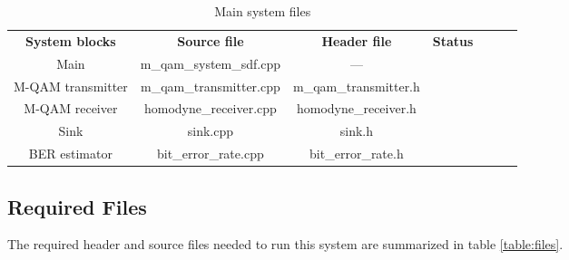 \begin{table}[]
	\centering
	\caption{Main system files}
	\begin{tabular}{|c|c|c|c|ccc}
		\cline{1-4}
		\textbf{System blocks} & \textbf{Source file} & \textbf{Header file}  &  \textbf{Status} & \\ \cline{1-4}
		Main & m\_qam\_system\_sdf.cpp & --- & \checkmark & \\ \cline{1-4}
		M-QAM transmitter & m\_qam\_transmitter.cpp & m\_qam\_transmitter.h & \checkmark &  \\ \cline{1-4}
		M-QAM receiver & homodyne\_receiver.cpp & homodyne\_receiver.h & &  \\ \cline{1-4}
		Sink & sink.cpp & sink.h &  \checkmark & \\ \cline{1-4}
		BER estimator & bit\_error\_rate.cpp & bit\_error\_rate.h &  &\\ \cline{1-4}
	\end{tabular}
	\label{files_table}
\end{table}

\subsection*{Required Files}

The required header and source files needed to run this system are summarized in table \ref{table:files}.

